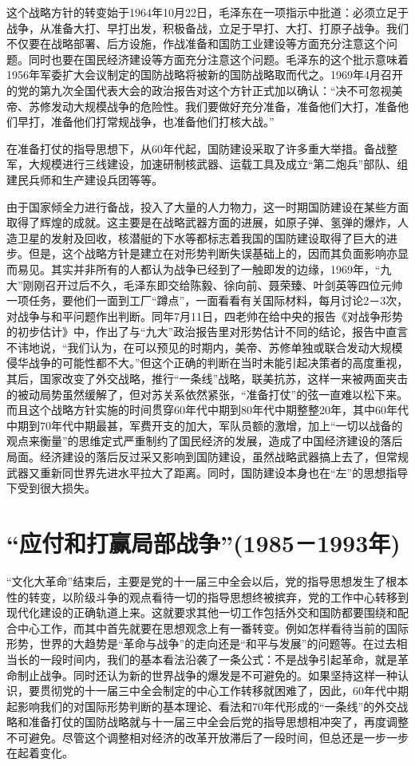 \documentclass[UTF8, 12pt, a4paper]{ctexrep}
\begin{document}
这个战略方针的转变始于1964年10月22日，毛泽东在一项指示中批道：必须立足于战争，从准备大打、早打出发，积极备战，立足于早打、大打、打原子战争。我们不仅要在战略部署、后方设施，作战准备和国防工业建设等方面充分注意这个问题。同时也要在国民经济建设等方面充分注意这个问题。毛泽东的这个批示意味着1956年军委扩大会议制定的国防战略将被新的国防战略取而代之。1969年4月召开的党的第九次全国代表大会的政治报告对这个方针正式加以确认：“决不可忽视美帝、苏修发动大规模战争的危险性。我们要做好充分准备，准备他们大打，准备他们早打，准备他们打常规战争，也准备他们打核大战。”

在准备打仗的指导思想下，从60年代起，国防建设采取了许多重大举措。备战整军，大规模进行三线建设，加速研制核武器、运载工具及成立“第二炮兵”部队、组建民兵师和生产建设兵团等等。

由于国家倾全力进行备战，投入了大量的人力物力，这一时期国防建设在某些方面取得了辉煌的成就。这主要是在战略武器方面的进展，如原子弹、氢弹的爆炸，人造卫星的发射及回收，核潜艇的下水等都标志着我国的国防建设取得了巨大的进步。但是，这个战略方针是建立在对形势判断失误基础上的，因而其负面影响亦显而易见。其实并非所有的人都认为战争已经到了一触即发的边缘，1969年，“九大”刚刚召开过后不久，毛泽东即交给陈毅、徐向前、聂荣臻、叶剑英等四位元帅一项任务，要他们一面到工厂“蹲点”，一面看看有关国际材料，每月讨论2－3次，对战争与和平问题作出判断。同年7月11日，四老帅在给中央的报告《对战争形势的初步估计》中，作出了与“九大”政治报告里对形势估计不同的结论，报告中直言不讳地说，“我们认为，在可以预见的时期内，美帝、苏修单独或联合发动大规模侵华战争的可能性都不大。”但这个正确的判断在当时未能引起决策者的高度重视，其后，国家改变了外交战略，推行“一条线”战略，联美抗苏，这样一来被两面夹击的被动局势虽然缓解了，但对苏关系依然紧张，“准备打仗”的弦一直难以松下来。而且这个战略方针实施的时间贯穿60年代中期到80年代中期整整20年，其中60年代中期到70年代中期最甚，军费开支的加大，军队员额的激增，加上“一切以战备的观点来衡量”的思维定式严重制约了国民经济的发展，造成了中国经济建设的落后局面。经济建设的落后反过采又影响到国防建设，虽然战略武器搞上去了，但常规武器又重新同世界先进水平拉大了距离。同时，国防建设本身也在“左”的思想指导下受到很大损失。

\section{“应付和打赢局部战争”(1985－1993年)}

“文化大革命”结束后，主要是党的十一届三中全会以后，党的指导思想发生了根本性的转变，以阶级斗争的观点看待一切的指导思想终被摈弃，党的工作中心转移到现代化建设的正确轨道上来。这就要求其他一切工作包括外交和国防都要围绕和配合中心工作，而其中首先就要在思想观念上有一番转变。例如怎样看待当前的国际形势，世界的大趋势是“革命与战争”的走向还是“和平与发展”的问题等。在过去相当长的一段时间内，我们的基本看法沿袭了一条公式：不是战争引起革命，就是革命制止战争。同时还认为新的世界战争的爆发是不可避免的。如果坚持这样一种认识，要贯彻党的十一届三中全会制定的中心工作转移就困难了，因此，60年代中期起影响我们的对国际形势判断的基本理论、看法和70年代形成的“一条线”的外交战略和准备打仗的国防战略就与十一届三中全会后党的指导思想相冲突了，再度调整不可避免。尽管这个调整相对经济的改革开放滞后了一段时间，但总还是一步一步在起着变化。
\end{document}
